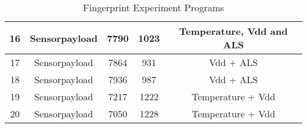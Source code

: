 \begin{table}[!ht]
\begin{tabular}{|c|c|c|c|c|}
16                   & Sensorpayload        & 7790          & 1023                   & Temperature, Vdd and ALS \\ \hline
17                   & Sensorpayload        & 7864          & 931                    & Vdd + ALS                \\ \hline
18                   & Sensorpayload        & 7936          & 987                    & Vdd + ALS                \\ \hline
19                   & Sensorpayload        & 7217          & 1222                   & Temperature + Vdd          \\ \hline
20                   & Sensorpayload        & 7050          & 1228                   & Temperature + Vdd          \\ \hline
\end{tabular}
\caption{Fingerprint Experiment Programs}
\label{FingerprintApps}
\end{table}

